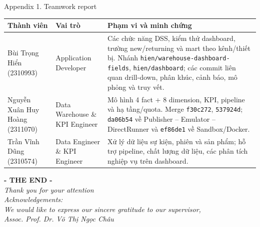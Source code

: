 \documentclass[aspectratio=169]{beamer}
\begin{document}
\begin{frame}{Appendix 1. Teamwork report}
  \small
  \begin{tabular}{@{}p{3cm}p{3.1cm}p{8cm}@{}}
    \toprule
    \textbf{Thành viên} & \textbf{Vai trò} & \textbf{Phạm vi và minh chứng} \\
    \midrule
    Bùi Trọng Hiển (2310993) &
    Application Developer &
    Các chức năng DSS, kiểm thử dashboard, trường new/returning và mart theo kênh/thiết bị.
    Nhánh \texttt{hien/warehouse-dashboard-fields}, \texttt{hien/dashboard};
    các commit liên quan drill-down, phân khúc, cảnh báo, mô phỏng và truy vết. \\
    \addlinespace
    Nguyễn Xuân Huy Hoàng (2311070) &
    Data Warehouse \& KPI Engineer &
    Mô hình 4 fact + 8 dimension, KPI, pipeline và hạ tầng/quota.
    Merge \texttt{f30c272}, \texttt{537924d};
    \texttt{da06b54} về Publisher -- Emulator -- DirectRunner và
    \texttt{ef86de1} về Sandbox/Docker. \\
    \addlinespace
    Trần Vĩnh Dũng (2310574) &
    Data Engineer \& KPI Engineer &
    Xử lý dữ liệu sự kiện, phiên và sản phẩm; hỗ trợ pipeline, chất lượng dữ liệu,
    các phân tích nghiệp vụ trên dashboard. \\
    \bottomrule
  \end{tabular}
\end{frame}

\begin{frame}
  \centering
  \vspace{1cm}
  \textbf{\Huge{- THE END - }}\\
  \vspace{0.2cm}
  \itshape{\Large{Thank you for your attention}}\\
  \vspace{15pt}
  Acknowledgements:\\
  We would like to express our sincere gratitude to our supervisor,\\
  Assoc. Prof. Dr. Võ Thị Ngọc Châu \\
\end{frame}
\end{document}
